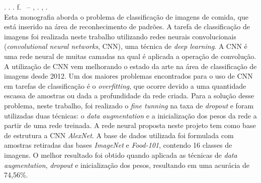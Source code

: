 
\begin{resumo}[RESUMO]
\begin{SingleSpacing}

\imprimirautorcitacao. \imprimirtitulo. \imprimirdata. \pageref {LastPage} f. \imprimirprojeto\ – \imprimirprograma, \imprimirinstituicao. \imprimirlocal, \imprimirdata.\\


Esta monografia aborda o problema de classificação de imagens de comida, que está inserido na área de reconhecimento de padrões. A tarefa de classificação de imagens foi realizada neste trabalho utilizando redes neurais convolucionais (\textit{convolutional neural networks}, CNN), uma técnica de \textit{deep learning}. A CNN é uma rede neural de muitas camadas na qual é aplicada a operação de convolução. A utilização de CNN vem melhorando o estado da arte na área de classificação de imagens desde 2012. Um dos maiores problemas encontrados para o uso de CNN em tarefas de classificação é o \textit{overfitting}, que ocorre devido a uma quantidade escassa de amostras ou dada a profundidade da rede criada. Para a solução desse problema, neste trabalho, foi realizado o \textit{fine tunning} na taxa de \textit{dropout} e foram utilizadas duas técnicas: o \textit{data augmentation} e a inicialização dos pesos da rede a partir de uma rede treinada. A rede neural proposta neste projeto tem como base de estrutura a CNN \textit{AlexNet}. A base de dados utilizada foi formulada com amostras retiradas das bases \textit{ImageNet} e \textit{Food-101}, contendo 16 classes de imagens. O melhor resultado foi obtido quando aplicada as técnicas de \textit{data augmentation}, \textit{dropout} e inicialização dos pesos, resultando em uma acurácia de 74,56\%.





\end{SingleSpacing}
\end{resumo}
